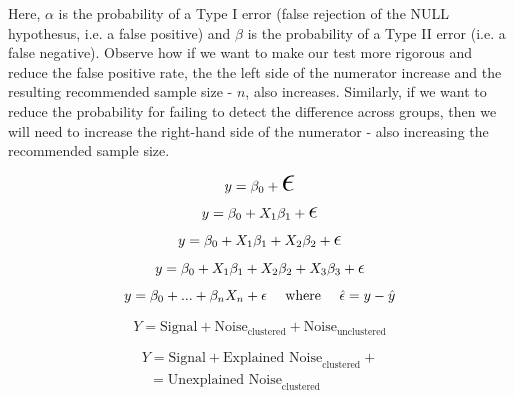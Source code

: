 \documentclass[12pt]{article}
\begin{document}
Here, $\alpha$ is the probability of a Type I error (false rejection of the NULL hypothesus, i.e. a false positive) and $\beta$ is the probability of a Type II error (i.e. a false negative). Observe how if we want to make our test more rigorous and reduce the false positive rate, the the left side of the numerator increase and the resulting recommended sample size - $n$, also increases. Similarly, if we want to reduce the probability for failing to detect the difference across groups, then we will need to increase the right-hand side of the numerator - also increasing the recommended sample size.

\newpage
\[ y = \beta_0 + \mathlarger{\mathlarger{\mathlarger{\mathlarger{\mathlarger{\mathlarger{\epsilon}}}}}} \]
\[ y = \beta_0 + X_1\beta_1 + \mathlarger{\mathlarger{\mathlarger{\epsilon}}}\]
\[ y = \beta_0 + X_1\beta_1 + X_2\beta_2 + \mathlarger{\mathlarger{\epsilon}}\]
\[ y = \beta_0 + X_1\beta_1 + X_2\beta_2 + X_3\beta_3 +\mathlarger{\epsilon}\]
\[ y = \beta_0 + ... + \beta_nX_n + \epsilon \text{\phantom{aa} where \phantom{aa}} \hat{\epsilon} = y - \hat{y}\]

\newpage
\[Y = \text{Signal} + \text{Noise}_{\text{clustered}} + \text{Noise}_{\text{unclustered}} \]




\begin{center}
\begin{multline}
Y = \text{Signal} + \text{Explained Noise}_{\text{clustered}} + \\
\phantom{a} =  \text{Unexplained Noise}_{\text{clustered}} 
\end{multline}
\end{center}
\end{document}
